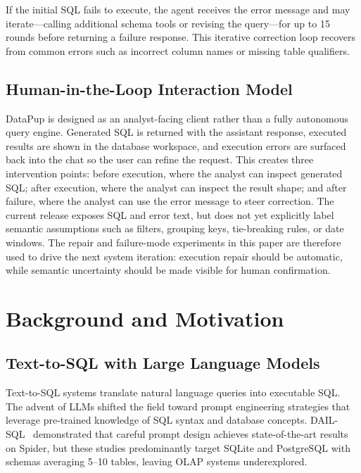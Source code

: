 \documentclass[sigconf, nonacm]{acmart}
\begin{document}
If the initial SQL fails to execute, the agent receives the error message and may iterate---calling additional schema tools or revising the query---for up to 15 rounds before returning a failure response. This iterative correction loop recovers from common errors such as incorrect column names or missing table qualifiers.

\subsection{Human-in-the-Loop Interaction Model}
DataPup is designed as an analyst-facing client rather than a fully autonomous query engine. Generated SQL is returned with the assistant response, executed results are shown in the database workspace, and execution errors are surfaced back into the chat so the user can refine the request. This creates three intervention points: before execution, where the analyst can inspect generated SQL; after execution, where the analyst can inspect the result shape; and after failure, where the analyst can use the error message to steer correction. The current release exposes SQL and error text, but does not yet explicitly label semantic assumptions such as filters, grouping keys, tie-breaking rules, or date windows. The repair and failure-mode experiments in this paper are therefore used to drive the next system iteration: execution repair should be automatic, while semantic uncertainty should be made visible for human confirmation.

\section{Background and Motivation}
\label{sec:background}

\subsection{Text-to-SQL with Large Language Models}
Text-to-SQL systems translate natural language queries into executable SQL. The advent of LLMs shifted the field toward prompt engineering strategies that leverage pre-trained knowledge of SQL syntax and database concepts. DAIL-SQL~\cite{gao2024dailsql} demonstrated that careful prompt design achieves state-of-the-art results on Spider, but these studies predominantly target SQLite and PostgreSQL with schemas averaging 5--10 tables, leaving OLAP systems underexplored.
\end{document}
